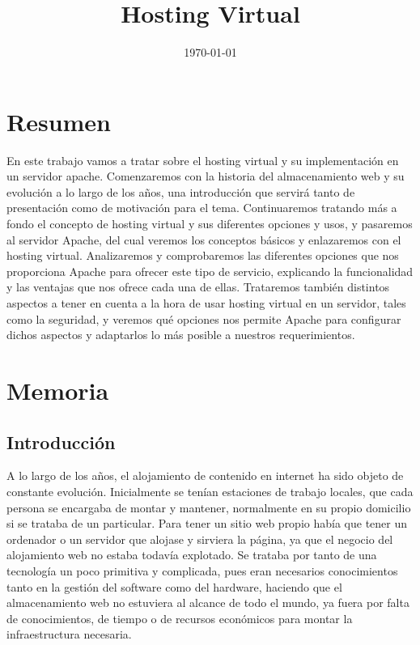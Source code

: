 \documentclass[a4paper, 10pt]{article} %
\title{\textbf{Hosting Virtual}} %
\date{\today} %
\begin{document}
\maketitle
\tableofcontents
\pagebreak

\section{Resumen}

En este trabajo vamos a tratar sobre el hosting virtual y su implementación en un servidor apache. Comenzaremos con la historia del almacenamiento web y su evolución a lo largo de los años, una introducción que servirá tanto de presentación como de motivación para el tema. Continuaremos tratando más a fondo el concepto de hosting virtual y sus diferentes opciones y usos, y pasaremos al servidor Apache, del cual veremos los conceptos básicos y enlazaremos con el hosting virtual. Analizaremos y comprobaremos las diferentes opciones que nos proporciona Apache para ofrecer este tipo de servicio, explicando la funcionalidad y las ventajas que nos ofrece cada una de ellas. Trataremos también distintos aspectos a tener en cuenta a la hora de usar hosting virtual en un servidor, tales como la seguridad, y veremos qué opciones nos permite Apache para configurar dichos aspectos y adaptarlos lo más posible a nuestros requerimientos. 


\section{Memoria}

\subsection{Introducción}

A lo largo de los años, el alojamiento de contenido en internet ha sido objeto de constante evolución. Inicialmente se tenían estaciones de trabajo locales, que cada persona se encargaba de montar y mantener, normalmente en su propio domicilio si se trataba de un particular. Para tener un sitio web propio había que tener un ordenador o un servidor que alojase y sirviera la página, ya que el negocio del alojamiento web no estaba todavía explotado. Se trataba por tanto de una tecnología un poco primitiva y complicada, pues eran necesarios conocimientos tanto en la gestión del software como del hardware, haciendo que el almacenamiento web no estuviera al alcance de todo el mundo, ya fuera por falta de conocimientos, de tiempo o de recursos económicos para montar la infraestructura necesaria.
 
\end{document}
